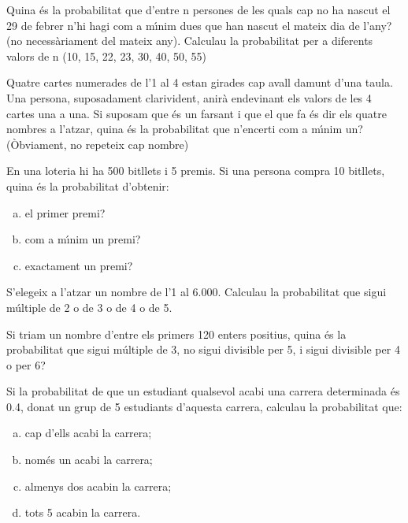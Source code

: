 \documentclass[12pt]{article}
\begin{document}
\probl  Quina \'{e}s la probabilitat que d'entre n persones de les
quals cap no ha nascut el 29 de febrer n'hi hagi com a m\'{\i}nim dues
que han nascut el mateix dia de l'any? (no necess\`{a}riament del
mateix any). Calculau la probabilitat per a diferents valors de n
(10, 15, 22, 23, 30, 40, 50, 55) 

\probl  Quatre cartes numerades de l'1 al 4 estan girades cap
avall damunt d'una taula. Una persona, suposadament clarivident,
anir\`{a} endevinant els valors de les 4 cartes una a una. Si suposam
que \'{e}s un farsant i que el que fa \'{e}s dir els quatre nombres a
l'atzar, quina \'{e}s la probabilitat que n'encerti com a m\'{\i}nim un?
(\`{O}bviament, no repeteix cap nombre) 

\probl  En una loteria hi ha 500 bitllets i 5 premis. Si una
persona compra 10 bitllets, quina \'{e}s la probabilitat d'obtenir:
\begin{enumerate}[a)]
\item el primer premi?
\item com a m\'{\i}nim un premi?
\item exactament un premi?
\end{enumerate} 

\probl  S'elegeix a l'atzar un nombre de l'1 al 6.000. Calculau la
probabilitat que sigui m\'{u}ltiple de 2 o de 3 o de 4 o de 5.


\probl  Si triam un nombre d'entre els primers 120 enters
positius, quina \'{e}s la probabilitat que sigui m\'{u}ltiple de 3, no
sigui divisible per 5, i sigui divisible per 4 o per 6? 


\probl  Si la probabilitat de que un estudiant qualsevol acabi una
carrera determinada \'{e}s 0.4, donat un grup de 5 estudiants
d'aquesta carrera, calculau la probabilitat que:

\begin{enumerate}[a)]
\item  cap d'ells acabi la carrera;
\item nom\'{e}s un acabi la carrera;
\item almenys dos acabin la carrera;
\item tots 5 acabin la
carrera.
\end{enumerate}
\end{document}
